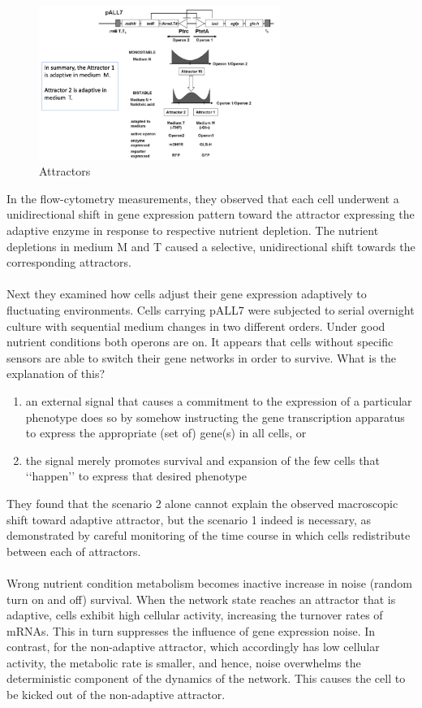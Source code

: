 \begin{figure}[h]
\includegraphics[width=0.7\textwidth]{attractors}
\caption{\label{fig:attractors} Attractors}
\end{figure}
\noindent
In the flow-cytometry measurements, they observed that each cell underwent a unidirectional shift in gene expression pattern toward the attractor expressing the adaptive enzyme in response to respective nutrient depletion. 
The nutrient depletions in medium M and T caused a selective, unidirectional shift towards the corresponding attractors.
\\
\\
\noindent
Next they examined how cells adjust their gene expression adaptively to fluctuating environments. Cells carrying pALL7 were subjected to serial overnight culture with sequential medium changes in two different orders. Under good nutrient conditions both operons are on. It appears that cells without specific sensors are able to switch their gene networks in order to survive.
What is the explanation of this? 
\begin{enumerate}
\item an external signal that causes a commitment to the expression of a particular phenotype does so by somehow instructing the gene transcription apparatus to express the appropriate (set of) gene(s) in all cells, or 
\item the signal merely promotes survival and expansion of the few cells that ‘‘happen’’ to express that desired phenotype 
\end{enumerate}
\noindent
They found that the scenario 2 alone cannot explain the observed macroscopic shift toward adaptive attractor, but the scenario 1 indeed is necessary, as demonstrated by careful monitoring of the time course in which cells redistribute between each of attractors. 
\\
\\
\noindent
Wrong nutrient condition metabolism becomes inactive  increase in noise (random turn on and off)  survival. When the network state reaches an attractor that is adaptive, cells exhibit high cellular activity, increasing the turnover rates of mRNAs. This in turn suppresses the influence of gene expression noise. In contrast, for the non-adaptive attractor, which accordingly has low cellular activity, the metabolic rate is smaller, and hence, noise overwhelms the deterministic component of the dynamics of the network. This causes the cell to be kicked out of the non-adaptive attractor. 
